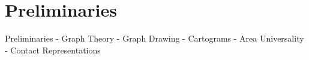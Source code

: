 \chapter{Preliminaries}
\label{chap:preliminaries}

\lipsum


Preliminaries
- Graph Theory
- Graph Drawing
- Cartograms
- Area Universality
- Contact Representations
